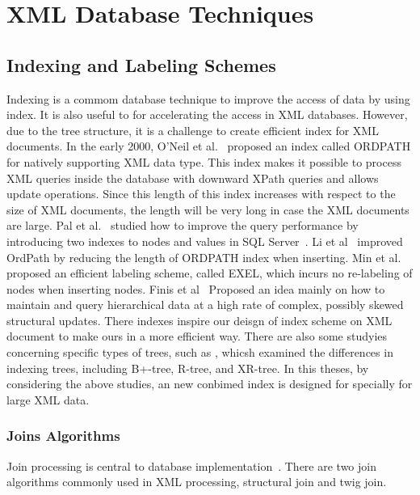 \section{XML Database Techniques}

\subsection{Indexing and Labeling Schemes}

Indexing is a commom database technique to improve the access of data 
by using index. It is also useful to for accelerating the access in XML databases. 
However, due to the tree structure, it is a challenge to create efficient 
index for XML documents.
In the early 2000, O'Neil et al.~\cite{OOPC04} proposed an index called ORDPATH
for natively supporting XML data type. This index makes it possible to process
XML queries inside the database with downward XPath queries and allows update
operations. Since this length of this index increases with respect to the size
of XML documents, the length will be very long in case the XML documents are
large. Pal et al.~\cite{PCSS04} studied how to improve the query performance by
introducing two indexes to nodes and values in SQL Server~\cite{sql2005}. Li et
al~\cite{LiLi05} improved OrdPath by reducing the length of ORDPATH index when
inserting. Min et al.~\cite{MLCh07} proposed an efficient labeling scheme,
called EXEL, which incurs no re-labeling of nodes when inserting nodes. Finis et
al~\cite{FBKF15} Proposed an idea mainly on how to maintain and query
hierarchical data at a high rate of complex, possibly skewed structural updates.
There indexes inspire our deisgn of index scheme on XML document to make ours in
a more efficient way. There are also some studyies concerning specific types of
trees, such as \cite{ToGr02,JLWO03,CVZZ08}, whicsh examined the differences in
indexing trees, including B+-tree, R-tree, and XR-tree. In this theses, by 
considering the above studies, an new conbimed index is designed for specially 
for large XML data.

\subsubsection{Joins Algorithms}

Join processing is central to database implementation~\cite{graefe1993query}.
There are two join algorithms commonly used in XML processing, structural join
and twig join.

